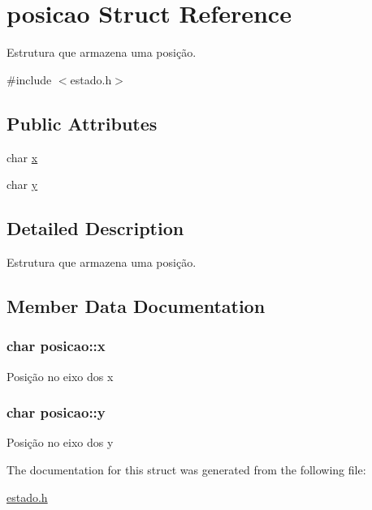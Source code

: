 \hypertarget{structposicao}{}\section{posicao Struct Reference}
\label{structposicao}


Estrutura que armazena uma posição.  




{\ttfamily \#include $<$estado.\+h$>$}

\subsection*{Public Attributes}
\begin{DoxyCompactItemize}
\item 
char \hyperlink{structposicao_abf2dfcd88579d554e31decb47f99e07e}{x}
\item 
char \hyperlink{structposicao_af3ac5b68917a89d8450851e8637231f0}{y}
\end{DoxyCompactItemize}


\subsection{Detailed Description}
Estrutura que armazena uma posição. 

\subsection{Member Data Documentation}
\subsubsection[{\texorpdfstring{x}{x}}]{\setlength{\rightskip}{0pt plus 5cm}char posicao\+::x}\hypertarget{structposicao_abf2dfcd88579d554e31decb47f99e07e}{}\label{structposicao_abf2dfcd88579d554e31decb47f99e07e}
Posição no eixo dos x 
\subsubsection[{\texorpdfstring{y}{y}}]{\setlength{\rightskip}{0pt plus 5cm}char posicao\+::y}\hypertarget{structposicao_af3ac5b68917a89d8450851e8637231f0}{}\label{structposicao_af3ac5b68917a89d8450851e8637231f0}
Posição no eixo dos y 

The documentation for this struct was generated from the following file\+:\begin{DoxyCompactItemize}
\item 
\hyperlink{estado_8h}{estado.\+h}\end{DoxyCompactItemize}
